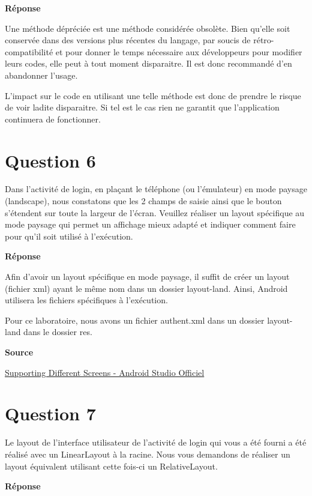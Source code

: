 \documentclass[francais,12pt]{article}
\begin{document}
		{\color[rgb]{0,0.5,0.23}\textbf{Réponse}}
        
		Une méthode dépréciée est une méthode considérée obsolète. Bien qu'elle soit conservée dans des versions plus récentes du langage, par soucis de rétro-compatibilité et pour donner le temps nécessaire aux développeurs pour modifier leurs codes, elle peut à tout moment disparaitre. Il est donc recommandé d'en abandonner l'usage. \newline
		
		L'impact sur le code en utilisant une telle méthode est donc de prendre le risque de voir ladite disparaitre. Si tel est le cas rien ne garantit que l'application continuera de fonctionner.
		
	\section*{Question 6}
		Dans l'activité de login, en plaçant le téléphone (ou l'émulateur) en mode paysage (landscape), nous constatons que les 2 champs de saisie ainsi que le bouton s'étendent sur toute la largeur de l'écran. Veuillez réaliser un layout spécifique au mode paysage qui permet un affichage mieux adapté et indiquer comment faire pour qu'il soit utilisé à l'exécution.  
		
		{\color[rgb]{0,0.5,0.23}\textbf{Réponse}}
        
        Afin d'avoir un layout spécifique en mode paysage, il suffit de créer un layout (fichier xml) ayant le même nom dans un dossier layout-land. Ainsi, Android utilisera les fichiers spécifiques à l'exécution.
        
        Pour ce laboratoire, nous avons un fichier authent.xml dans un dossier layout-land dans le dossier res.
		
		\textbf{Source}
        
        \href{https://developer.android.com/training/basics/supporting-devices/screens.html}{Supporting Different Screens - Android Studio Officiel}
		
	\section*{Question 7}
		Le layout de l'interface utilisateur de l'activité de login qui vous a été fourni a été réalisé avec un LinearLayout à la racine. Nous vous demandons de réaliser un layout équivalent utilisant cette fois-ci un RelativeLayout.  
		
		{\color[rgb]{0,0.5,0.23}\textbf{Réponse}}
        
\end{document}
